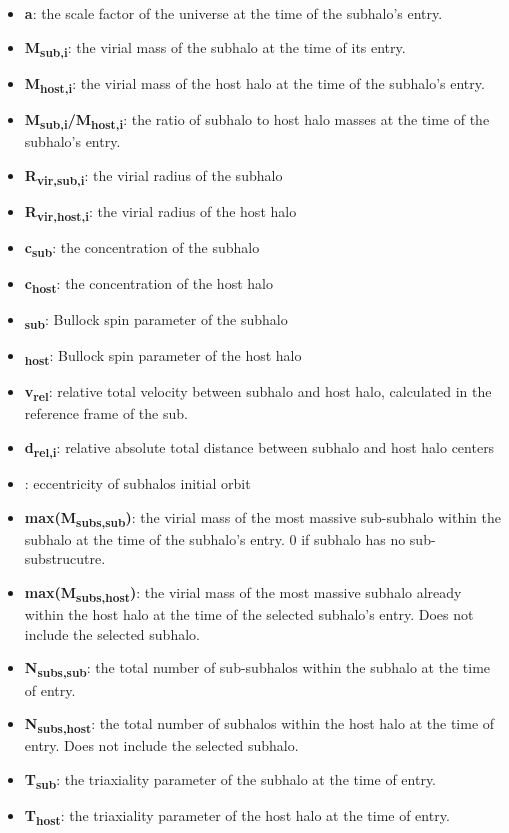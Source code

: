 \documentclass[fleqn,usenatbib]{mnras}
\begin{document}
    \begin{itemize}
        \item \textbf{a}: the scale factor of the universe at the time of the subhalo's entry.
        \item \textbf{M\textsubscript{sub,i}}: the virial mass of the subhalo at the time of its entry.
        \item \textbf{M\textsubscript{host,i}}: the virial mass of the host halo at the time of the subhalo's entry.
        \item \textbf{M\textsubscript{sub,i}/M\textsubscript{host,i}}: the ratio of subhalo to host halo masses at the time of the subhalo's entry.
        \item \textbf{R\textsubscript{vir,sub,i}}: the virial radius of the subhalo
        \item \textbf{R\textsubscript{vir,host,i}}: the virial radius of the host halo
        \item \textbf{c\textsubscript{sub}}: the concentration of the subhalo
        \item \textbf{c\textsubscript{host}}: the concentration of the host halo
        \item \textbf{\textlambda\textsubscript{sub}}: Bullock spin parameter of the subhalo
        \item \textbf{\textlambda\textsubscript{host}}: Bullock spin parameter of the host halo
        \item \textbf{v\textsubscript{rel}}: relative total velocity between subhalo and host halo, calculated in the reference frame of the sub.
        \item \textbf{d\textsubscript{rel,i}}: relative absolute total distance between subhalo and host halo centers
        \item \textbf{\textepsilon}: eccentricity of subhalos initial orbit
        \item \textbf{max(M\textsubscript{subs,sub})}: the virial mass of the most massive sub-subhalo within the subhalo at the time of the subhalo's entry. 0 if subhalo has no sub-substrucutre.
        \item \textbf{max(M\textsubscript{subs,host})}: the virial mass of the most massive subhalo already within the host halo at the time of the selected subhalo's entry. Does not include the selected subhalo.
        \item \textbf{N\textsubscript{subs,sub}}: the total number of sub-subhalos within the subhalo at the time of entry.
        \item \textbf{N\textsubscript{subs,host}}:  the total number of subhalos within the host halo at the time of entry. Does not include the selected subhalo.
        \item \textbf{T\textsubscript{sub}}: the triaxiality parameter of the subhalo at the time of entry.
        \item \textbf{T\textsubscript{host}}:  the triaxiality parameter of the host halo at the time of entry.
    \end{itemize}
    
\end{document}
